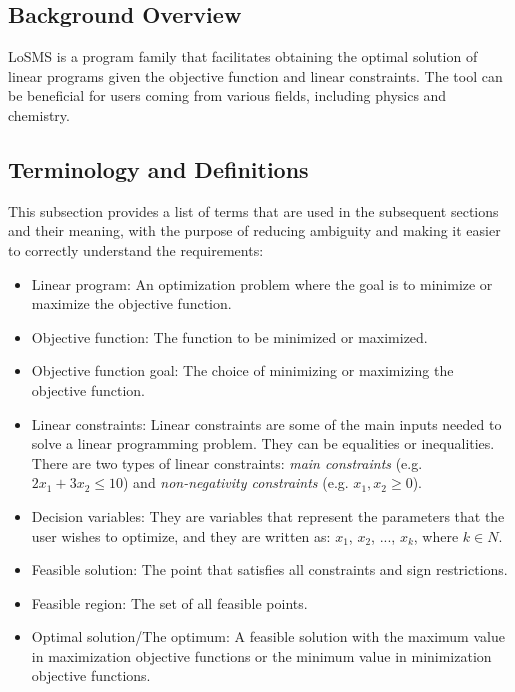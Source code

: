 \documentclass[12pt]{article}
\newcommand{\famname}{LoSMS} %
\begin{document}
\subsection{Background Overview} \label{Sec_Background}

\famname{} is a program family that facilitates obtaining the optimal solution 
of linear programs given the objective function and linear constraints. The 
tool can be beneficial for users coming from various fields, including physics 
and chemistry.


\subsection{Terminology and  Definitions}

This subsection provides a list of terms that are used in the subsequent
sections and their meaning, with the purpose of reducing ambiguity and making it
easier to correctly understand the requirements:

\begin{itemize}
	\item Linear program: An optimization problem where the goal is to minimize 
	or maximize the objective function.
	
	\item Objective function: The function to be minimized or maximized.
	
	\item Objective function goal: The choice of minimizing or maximizing the 
	objective function.
	
	\item Linear constraints: Linear constraints are some of the main inputs 
	needed to solve a linear programming problem. They can be equalities or 
	inequalities. There are two types of linear constraints: \textit{main 
	constraints} (e.g. $2x_1 + 3x_2 \leq 10$) and \textit{non-negativity 
	constraints} (e.g. $x_1, x_2 \geq 0$).
	
	\item Decision variables: They are variables that represent the parameters 
	that the user wishes to optimize, and they are written as: ${x_1}$, 
	${x_2}$, ..., ${x_k}$, where $k \in N$.
	
	\item Feasible solution: The point that satisfies all constraints and sign 
	restrictions.
	
	\item Feasible region: The set of all feasible points.
	
	\item Optimal solution/The optimum: A feasible solution with the maximum 
	value in maximization objective functions or the minimum value in 
	minimization objective functions.
\end{itemize}
\end{document}
